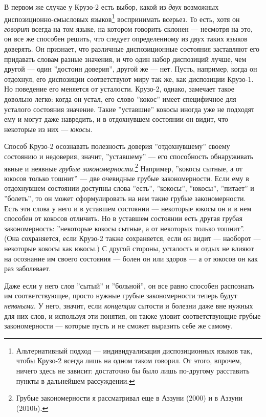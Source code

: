 \documentclass[11pt]{book}
\begin{document}
В первом же случае у Крузо-2 есть выбор, какой из \textit{двух} возможных диспозиционно-смысловых языков\footnote{Альтернативный подход --- индивидуализация диспозиционных языков так, чтобы Крузо-2 всегда лишь на одном таком говорил. От этого, впрочем, ничего здесь не зависит: достаточно бы было лишь по-другому расставить пункты в дальнейшем рассуждении.} воспринимать всерьез. То есть, хотя он \textit{говорит} всегда на том языке, на котором говорить склонен --- несмотря на это, он все же способен решить, что следует определенному из двух таких языков доверять. Он признает, что различные диспозиционные состояния заставляют его придавать словам разные значения, и что один набор диспозиций лучше, чем другой --- один ''достоин доверия'', другой же --- нет. Пусть, например, когда он отдохнул, его диспозиции соответствуют миру так же, как диспозиции Крузо-1. Но поведение его меняется от усталости. Крузо-2, однако, замечает такое довольно легко: когда он устал, его слово ''кокос'' имеет специфичное для усталого состояния значение. Такие ''уставшие'' кокосы иногда уже не подходят ему и могут даже навредить, и в отдохнувшем состоянии он видит, что некоторые из них --- \textit{юкосы}.

Способ Крузо-2 осознавать полезность доверия ''отдохнувшему'' своему состоянию и недоверия, значит, ''уставшему'' --- его способность обнаруживать явные и неявные \textit{грубые закономерности}.\footnote{Грубые закономерности я рассматривал еще в Аззуни (2000) и в Аззуни (2010b).} Например, ''кокосы сытные, а от юкосов только тошнит'' --- две очевидные грубые закономерности. Если ему в отдохнувшем состоянии доступны слова ''есть'', ''кокосы'', ''юкосы'', ''питает'' и ''болеть'', то он может сформулировать на нем такие грубые закономерности. Есть эти слова у него и в уставшем состоянии --- некоторые юкосы он и в нем способен от кокосов отличить. Но в уставшем состоянии есть другая грубая закономерность: ''некоторые кокосы сытные, а от некоторых только тошнит''. (Она сохраняется, если Крузо-2 также сохраняется, если он видит --- наоборот --- некоторые кокосы как юкосы.) С другой стороны, усталость и отдых не влияют на осознание им своего состояния --- болен он или здоров --- а от юкосов он как раз заболевает.

Даже если у него слов ''сытый'' и ''больной'', он все равно способен распознать им соответствующее, просто нужные грубые закономерности теперь будут \textit{неявными}. У него, значит, если \textit{концепции} сытости и болезни даже вне нужных для них слов, и используя эти понятия, он также уловит соответствующие грубые закономерности --- которые пусть и не сможет выразить себе же самому.
\end{document}
